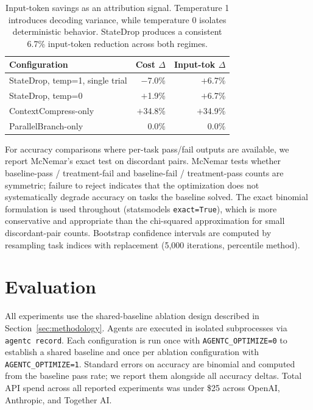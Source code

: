 \documentclass[sigconf,9pt]{acmart}
\begin{document}
\begin{table}[t]
\caption{Input-token savings as an attribution signal. Temperature 1 introduces
decoding variance, while temperature 0 isolates deterministic behavior. StateDrop
produces a consistent 6.7\% input-token reduction across both regimes.}
\label{tab:attribution}
\small
\begin{tabular}{lrr}
\toprule
Configuration & Cost $\Delta$ & Input-tok $\Delta$ \\
\midrule
StateDrop, temp=1, single trial  & $-$7.0\% & $+$6.7\% \\
StateDrop, temp=0                & $+$1.9\% & $+$6.7\% \\
ContextCompress-only             & $+$34.8\% & $+$34.9\% \\
ParallelBranch-only              & $0.0\%$  & $0.0\%$ \\
\bottomrule
\end{tabular}
\end{table}

For accuracy comparisons where per-task pass/fail outputs are available, we report
McNemar's exact test on discordant pairs. McNemar tests whether baseline-pass /
treatment-fail and baseline-fail / treatment-pass counts are symmetric; failure to
reject indicates that the optimization does not systematically degrade accuracy on
tasks the baseline solved. The exact binomial formulation is used throughout
(statsmodels \texttt{exact=True}), which is more conservative and appropriate than the
chi-squared approximation for small discordant-pair counts. Bootstrap confidence
intervals are computed by resampling task indices with replacement (5{,}000
iterations, percentile method).

\section{Evaluation}
\label{sec:eval}

All experiments use the shared-baseline ablation design described in
Section~\ref{sec:methodology}. Agents are executed in isolated subprocesses via
\texttt{agentc record}. Each configuration is run once with
\texttt{AGENTC\_OPTIMIZE=0} to establish a shared baseline and once per ablation
configuration with \texttt{AGENTC\_OPTIMIZE=1}. Standard errors on accuracy are
binomial and computed from the baseline pass rate; we report them alongside all
accuracy deltas. Total API spend across all reported experiments was under \$25
across OpenAI, Anthropic, and Together AI.
\end{document}
